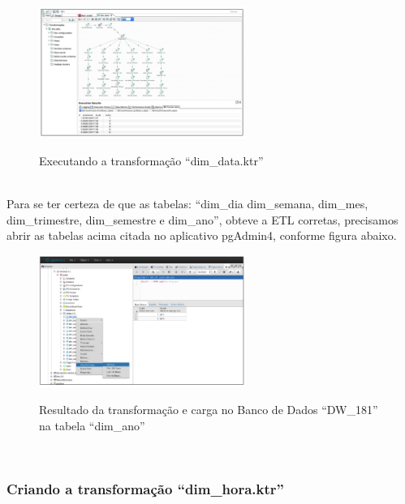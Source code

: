 \begin{figure}[H]
	\vspace*{0,2cm}
    \centering
    \caption{Executando a transforma\c{c}\~{a}o ``dim\_data.ktr''}
    \includegraphics[width=0.6\textwidth]{./04-figuras/figura-exec-dim-data}
    \label{fig:ilustfigtbdimano}
\end{figure}
\vspace*{-0,9cm}
{\raggedright {}} \\

Para se ter certeza de que as tabelas: 
``dim\_dia dim\_semana, dim\_mes, dim\_trimestre, dim\_semestre e dim\_ano'', obteve a ETL corretas, 
precisamos abrir as tabelas acima citada no aplicativo pgAdmin4, conforme figura abaixo.

\begin{figure}[H]
	\vspace*{0,2cm}
    \centering
    \caption{Resultado da transforma\c{c}\~{a}o e carga no Banco de Dados ``DW\_181'' na tabela ``dim\_ano''}
    \includegraphics[width=0.6\textwidth]{./04-figuras/figura-res-dim-ano}
    \label{fig:ilustfigresdimano}
\end{figure}
\vspace*{-0,9cm}
{\raggedright {}} \\

\subsubsection{Criando a transforma\c{c}\~{a}o ``dim\_hora.ktr''}

